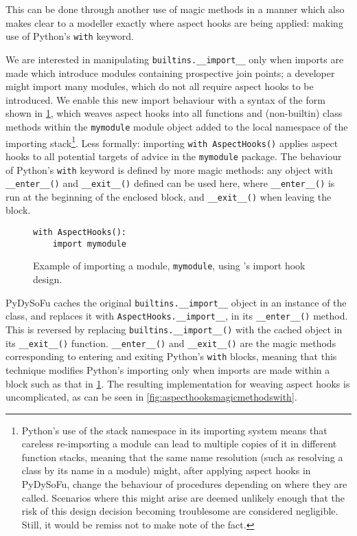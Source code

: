 
This can be done through another use of magic methods in a manner which also
makes clear to a modeller exactly where aspect hooks are being applied: making
use of Python's \lstinline{with} keyword. 


We are interested in manipulating \lstinline{builtins.__import__} only when
imports are made which introduce modules containing prospective join points;
a developer might import many modules, which do not all require aspect hooks to 
be introduced. We enable this new import
behaviour with a syntax of the form shown in \cref{fig:simple_aspect_hook_weaving_example},
which weaves aspect hooks into all functions and (non-builtin)
class methods within the \lstinline{mymodule} module object added to the local
namespace of the importing stack\footnote{Python's use of the stack namespace in
its importing system means that careless re-importing a module can lead to
multiple copies of it in different function stacks, meaning that the same name
resolution (such as resolving a class by its name in a module) might, after
applying aspect hooks in PyDySoFu, change the behaviour of procedures depending
on where they are called. Scenarios where this might arise are deemed unlikely
enough that the risk of this design decision becoming troublesome are considered
negligible. Still, it would be remiss not to make note of the fact.}. Less
formally: importing \lstinline{with AspectHooks()} applies aspect hooks to all
potential targets of advice in the \lstinline{mymodule} package. The behaviour
of Python's \lstinline{with} keyword is defined by more magic methods: any
object with \lstinline{__enter__()} and \lstinline{__exit__()} defined can be
used here, where \lstinline{__enter__()} is run at the beginning of the enclosed
block, and \lstinline{__exit__()} when leaving the block.

\begin{figure}\label{fig:simple_aspect_hook_weaving_example}
\begin{lstlisting}
with AspectHooks():
    import mymodule
\end{lstlisting}
\caption{Example of importing a module, \lstinline{mymodule}, using \pdsf{}'s import hook design.}
\end{figure}


PyDySoFu caches the original \lstinline{builtins.__import__} object in an
instance of the class, and replaces it with \lstinline{AspectHooks.__import__},
in its \lstinline{__enter__()} method. This is reversed by replacing
\lstinline{builtins.__import__()} with the cached object in its
\lstinline{__exit__()} function. \lstinline{__enter__()} and \lstinline{__exit__()} are the
magic methods corresponding to entering and exiting Python's \lstinline{with} blocks, meaning
that this technique modifies Python's importing only when imports are made
within a block such as that in \cref{fig:simple_aspect_hook_weaving_example}.
The resulting implementation for weaving aspect
hooks is uncomplicated, as can be seen in \cref{fig:aspecthooksmagicmethodswith}.

